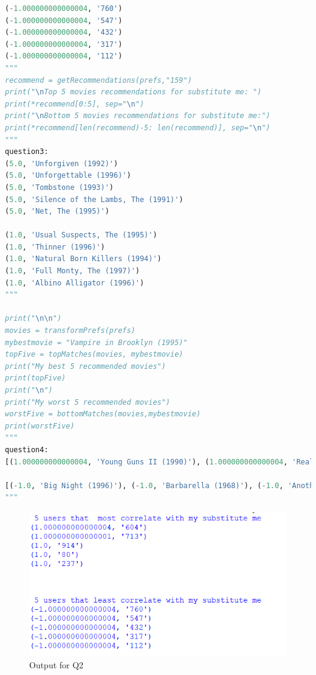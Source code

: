 \documentclass[12pt]{article}
\begin{document}
\begin{lstlisting}[language=Python, caption=two.py , label=2nd:copy]
(-1.000000000000004, '760')
(-1.000000000000004, '547')
(-1.000000000000004, '432')
(-1.000000000000004, '317')
(-1.000000000000004, '112')
"""
recommend = getRecommendations(prefs,"159")
print("\nTop 5 movies recommendations for substitute me: ")
print(*recommend[0:5], sep="\n")
print("\nBottom 5 movies recommendations for substitute me:")
print(*recommend[len(recommend)-5: len(recommend)], sep="\n")
"""
question3:
(5.0, 'Unforgiven (1992)')
(5.0, 'Unforgettable (1996)')
(5.0, 'Tombstone (1993)')
(5.0, 'Silence of the Lambs, The (1991)')
(5.0, 'Net, The (1995)')

(1.0, 'Usual Suspects, The (1995)')
(1.0, 'Thinner (1996)')
(1.0, 'Natural Born Killers (1994)')
(1.0, 'Full Monty, The (1997)')
(1.0, 'Albino Alligator (1996)')
"""

print("\n\n")
movies = transformPrefs(prefs)
mybestmovie = "Vampire in Brooklyn (1995)"
topFive = topMatches(movies, mybestmovie)
print("My best 5 recommended movies")
print(topFive)
print("\n")
print("My worst 5 recommended movies")
worstFive = bottomMatches(movies,mybestmovie)
print(worstFive)
"""
question4:
[(1.000000000000004, 'Young Guns II (1990)'), (1.000000000000004, 'Reality Bites (1994)'), (1.000000000000001, 'Ran (1985)'), (1.000000000000001, 'Butch Cassidy and the Sundance Kid (1969)'), (1.0000000000000009, 'Chinatown (1974)')]

[(-1.0, 'Big Night (1996)'), (-1.0, 'Barbarella (1968)'), (-1.0, 'Another Stakeout (1993)'), (-1.0000000000000007, "Fathers' Day (1997)"), (-1.000000000000004, "Devil's Own, The (1997)")]
"""
\end{lstlisting}
\begin{figure}[h]
    \centering
    \includegraphics[trim=0 0 0 0, clip, width=\textwidth] {Capture1.PNG}
    \caption{Output for Q2}
    \label{fig2}
\end{figure}
\end{document}
